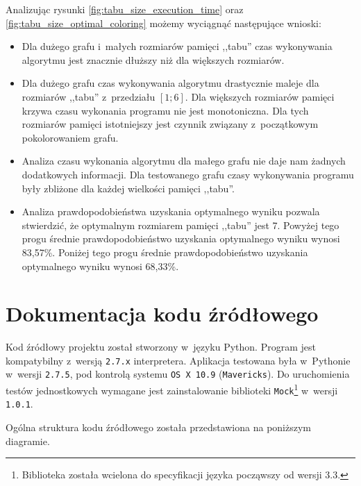 \documentclass[a4paper,10pt]{article}
\begin{document}
Analizując rysunki \ref{fig:tabu_size_execution_time} oraz \ref{fig:tabu_size_optimal_coloring} możemy wyciągnąć następujące wnioski:

\begin{itemize}
    \item Dla dużego grafu i~małych rozmiarów pamięci ,,tabu'' czas wykonywania algorytmu jest znacznie dłuższy niż dla większych rozmiarów.
    \item Dla dużego grafu czas wykonywania algorytmu drastycznie maleje dla rozmiarów ,,tabu'' z~przedziału $[1; 6]$. Dla większych rozmiarów pamięci krzywa czasu wykonania programu nie jest monotoniczna. Dla tych rozmiarów pamięci istotniejszy jest czynnik związany z~początkowym pokolorowaniem grafu.
    \item Analiza czasu wykonania algorytmu dla małego grafu nie daje nam żadnych dodatkowych informacji. Dla testowanego grafu czasy wykonywania programu były zbliżone dla każdej wielkości pamięci ,,tabu''.
    \item Analiza prawdopodobieństwa uzyskania optymalnego wyniku pozwala stwierdzić, że optymalnym rozmiarem pamięci ,,tabu'' jest 7. Powyżej tego progu średnie prawdopodobieństwo uzyskania optymalnego wyniku wynosi 83,57\%. Poniżej tego progu średnie prawdopodobieństwo uzyskania optymalnego wyniku wynosi 68,33\%.
\end{itemize}

\pagebreak

\section*{Dokumentacja kodu źródłowego}

Kod źródłowy projektu został stworzony w~języku Python. Program jest kompatybilny z~wersją \verb+2.7.x+ interpretera. Aplikacja testowana była w~Pythonie w~wersji \verb+2.7.5+, pod kontrolą systemu \verb+OS X 10.9+ (\verb+Mavericks+). Do uruchomienia testów jednostkowych wymagane jest zainstalowanie biblioteki \verb+Mock+\footnote{Biblioteka została wcielona do specyfikacji języka począwszy od wersji 3.3.} w~wersji \verb+1.0.1+.

Ogólna struktura kodu źródłowego została przedstawiona na poniższym diagramie.

 
\end{document}
